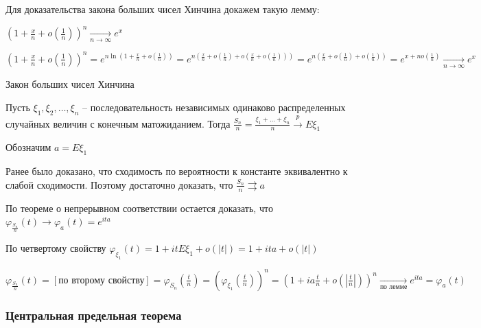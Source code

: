 Для доказательства закона больших чисел Хинчина докажем такую лемму: 

$\left(1 + \frac{x}{n} + o\left(\frac{1}{n}\right)\right)^n \underset{n \to \infty}{\longrightarrow} e^x$

\begin{MyProof}
    $\left(1 + \frac{x}{n} + o\left(\frac{1}{n}\right)\right)^n = e^{n \ln\left(1 + \frac{x}{n} + o\left(\frac{1}{n}\right)\right)} = 
    e^{n \left(\frac{x}{n} + o\left(\frac{1}{n}\right) + o\left(\frac{x}{n} + o\left(\frac{1}{n}\right)\right)\right)} = e^{n\left(\frac{x}{n} + o\left(\frac{1}{n}\right) + o\left(\frac{1}{n}\right)\right)} = e^{x + n o\left(\frac{1}{n}\right)} \underset{n \to \infty}{\longrightarrow} e^x$
\end{MyProof}

\hypertarget{lawofbignumberskhinchin2}{}

\begin{MyTheorem}
    \Ths Закон больших чисел Хинчина

    Пусть $\xi_1, \xi_2, \dots, \xi_n$ -- последовательность независимых одинаково распределенных случайных величин с конечным матожиданием.
    Тогда $\frac{S_n}{n} = \frac{\xi_1 + \dots + \xi_n}{n} \overset{p}{\longrightarrow} E\xi_1$
\end{MyTheorem}

\begin{MyProof}
    Обозначим $a = E\xi_1$

    Ранее было доказано, что сходимость по вероятности к константе эквивалентно к слабой сходимости. Поэтому достаточно доказать, что $\frac{S_n}{n} \rightrightarrows a$

    По теореме о непрерывном соответствии остается доказать, что $\varphi_{\frac{S_n}{n}}(t) \longrightarrow \varphi_a(t) = e^{ita}$

    По четвертому свойству $\varphi_{\xi_1}(t) = 1 + itE\xi_1 + o(|t|) = 1 + ita + o(|t|)$

    $\varphi_{\frac{S_n}{n}}(t) = [\text{по второму свойству}] = \varphi_{S_n}\left(\frac{t}{n}\right) = \left(\varphi_{\xi_1}\left(\frac{t}{n}\right)\right)^n = \left(1 + ia\frac{t}{n} + o\left(\left|\frac{t}{n}\right|\right)\right)^n \underset{\text{по лемме}}{\longrightarrow}
    e^{ita} = \varphi_a(t)$
\end{MyProof}

\subsubsection{Центральная предельная теорема}

